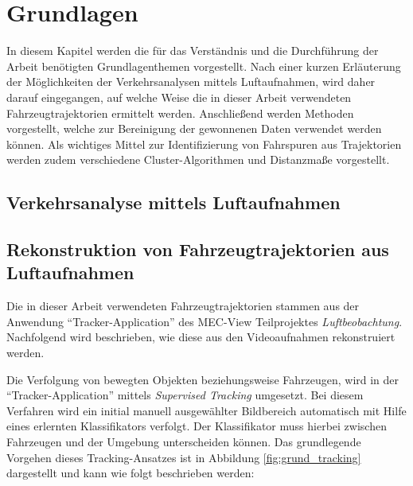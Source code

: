 
\chapter{Grundlagen}
\label{cha:grundlagen}

In diesem Kapitel werden die für das Verständnis und die Durchführung der Arbeit benötigten
Grundlagenthemen vorgestellt. Nach einer kurzen Erläuterung der Möglichkeiten der Verkehrsanalysen
mittels Luftaufnahmen, wird daher darauf eingegangen, auf welche Weise die in dieser Arbeit verwendeten
Fahrzeugtrajektorien ermittelt werden.
Anschließend werden Methoden vorgestellt, welche zur Bereinigung der gewonnenen Daten verwendet werden können.
Als wichtiges Mittel zur Identifizierung von Fahrspuren aus Trajektorien werden zudem
verschiedene Cluster-Algorithmen und Distanzmaße vorgestellt. 

\section{Verkehrsanalyse mittels Luftaufnahmen}
\label{sec:traffic_analysis}


\section{Rekonstruktion von Fahrzeugtrajektorien aus Luftaufnahmen}
\label{sec:position_extraction}


Die in dieser Arbeit verwendeten Fahrzeugtrajektorien stammen aus der Anwendung ``Tracker-Application''
des MEC-View Teilprojektes \textit{Luftbeobachtung}. Nachfolgend wird beschrieben, wie diese aus den Videoaufnahmen
rekonstruiert werden.

Die Verfolgung von bewegten Objekten beziehungsweise Fahrzeugen, wird in der ``Tracker-Application'' mittels
\textit{Supervised Tracking} umgesetzt. Bei diesem Verfahren wird ein initial manuell ausgewählter Bildbereich
automatisch mit Hilfe eines erlernten Klassifikators verfolgt. Der Klassifikator muss hierbei zwischen
Fahrzeugen und der Umgebung unterscheiden können.
Das grundlegende Vorgehen dieses Tracking-Ansatzes ist in Abbildung \ref{fig:grund_tracking}
dargestellt und kann wie folgt beschrieben werden:

